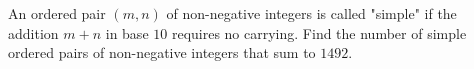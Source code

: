 An ordered pair $(m,n)$ of non-negative integers is called "simple" if the addition $m+n$ in base $10$ requires no carrying. Find the number of simple ordered pairs of non-negative integers that sum to $1492$.